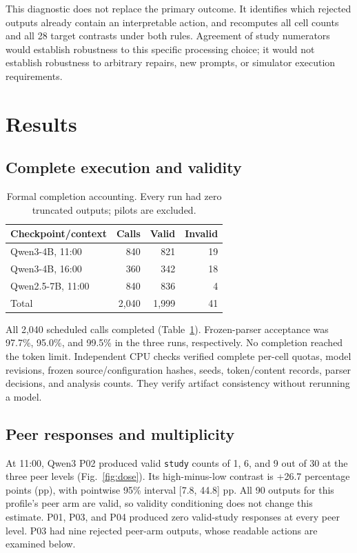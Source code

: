 \documentclass[conference]{IEEEtran}
\newcommand{\code}[1]{\texttt{#1}}
\newcommand{\Qthree}{Qwen3-4B}
\newcommand{\Qtwo}{Qwen2.5-7B}
\begin{document}
This diagnostic does not replace the primary outcome. It identifies which rejected outputs already contain an interpretable action, and recomputes all cell counts and all 28 target contrasts under both rules. Agreement of study numerators would establish robustness to this specific processing choice; it would not establish robustness to arbitrary repairs, new prompts, or simulator execution requirements.

\section{Results}
\subsection{Complete execution and validity}
\begin{table}[t]
\caption{Formal completion accounting. Every run had zero truncated outputs; pilots are excluded.}
\label{tab:completion}
\centering\small
\begin{tabular}{lrrr}\toprule
Checkpoint/context & Calls & Valid & Invalid\\\midrule
\Qthree{}, 11:00 & 840 & 821 & 19\\
\Qthree{}, 16:00 & 360 & 342 & 18\\
\Qtwo{}, 11:00 & 840 & 836 & 4\\\midrule
Total & 2,040 & 1,999 & 41\\\bottomrule
\end{tabular}
\end{table}
All 2,040 scheduled calls completed (Table~\ref{tab:completion}). Frozen-parser acceptance was 97.7\%, 95.0\%, and 99.5\% in the three runs, respectively. No completion reached the token limit. Independent CPU checks verified complete per-cell quotas, model revisions, frozen source/configuration hashes, seeds, token/content records, parser decisions, and analysis counts. They verify artifact consistency without rerunning a model.

\subsection{Peer responses and multiplicity}
At 11:00, Qwen3 P02 produced valid \code{study} counts of 1, 6, and 9 out of 30 at the three peer levels (Fig.~\ref{fig:dose}). Its high-minus-low contrast is +26.7 percentage points (pp), with pointwise 95\% interval [7.8, 44.8] pp. All 90 outputs for this profile's peer arm are valid, so validity conditioning does not change this estimate. P01, P03, and P04 produced zero valid-study responses at every peer level. P03 had nine rejected peer-arm outputs, whose readable actions are examined below.
\end{document}
